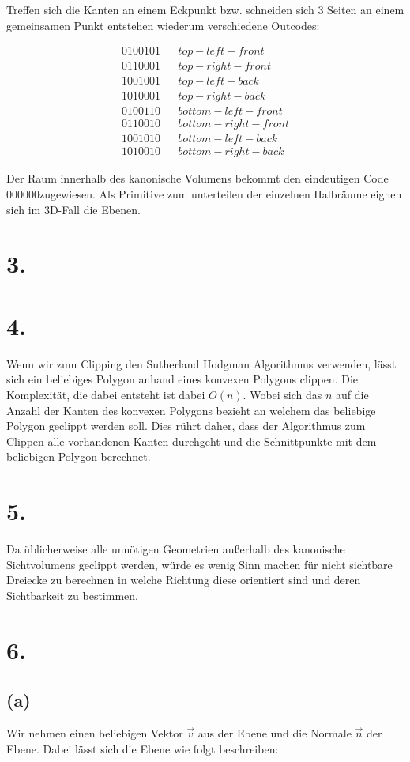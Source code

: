 \documentclass[12pt]{scrreprt}
\begin{document}
Treffen sich die Kanten an einem Eckpunkt bzw. schneiden sich 3 Seiten an einem gemeinsamen Punkt entstehen wiederum verschiedene Outcodes:

\begin{align*}
	0100101& &top-left-front\\
	0110001& &top-right-front\\
	1001001& &top-left-back\\
	1010001& &top-right-back\\
	0100110& &bottom-left-front\\
	0110010& &bottom-right-front\\
	1001010& &bottom-left-back\\
	1010010& &bottom-right-back
\end{align*}

Der Raum innerhalb des kanonische Volumens bekommt den eindeutigen Code $000000$zugewiesen. Als Primitive zum unterteilen der einzelnen Halbräume eignen sich im 3D-Fall die Ebenen.

\section*{3.}
\section*{4.}
Wenn wir zum Clipping den Sutherland Hodgman Algorithmus verwenden, lässt sich ein beliebiges Polygon anhand eines konvexen Polygons clippen. Die Komplexität, die dabei entsteht ist dabei $O(n)$. Wobei sich das $n$ auf die Anzahl der Kanten des konvexen Polygons bezieht an welchem das beliebige Polygon geclippt werden soll. Dies rührt daher, dass der Algorithmus zum Clippen alle vorhandenen Kanten durchgeht und die Schnittpunkte mit dem beliebigen Polygon berechnet.
\section*{5.}
Da üblicherweise alle unnötigen Geometrien außerhalb des kanonische Sichtvolumens geclippt werden, würde es wenig Sinn machen für nicht sichtbare Dreiecke zu berechnen in welche Richtung diese orientiert sind und deren Sichtbarkeit zu bestimmen.
\section*{6.}
\subsection*{(a)}
Wir nehmen einen beliebigen Vektor $\vec{v}$ aus der Ebene und die Normale $\vec{n}$ der Ebene. Dabei lässt sich die Ebene wie folgt beschreiben:
\end{document}
